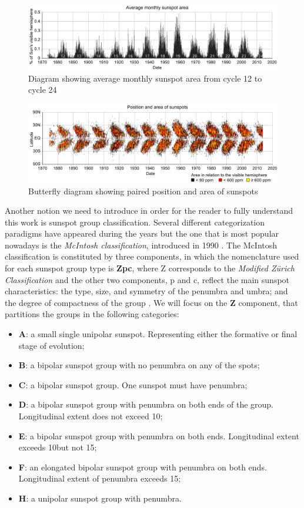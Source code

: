 \begin{figure}[t]
    \centering
    \includegraphics[width=\textwidth]{./pictures/ssarea}
    \caption{Diagram showing average monthly sunspot area from cycle 12 to cycle 24}
    \label{fig:ssarea}
\end{figure}
\begin{figure}[t]
    \centering
    \includegraphics[width=\textwidth]{./pictures/butterfly}
    \caption{Butterfly diagram showing paired position and area of sunspots}
    \label{fig:butterfly}
\end{figure}
Another notion we need to introduce in order for the reader to fully understand this work is sunspot group classification. Several different categorization paradigms have appeared during the years but the one that is most popular nowadays is the \textit{McIntosh classification}, introduced in 1990 \cite{mcintosh1990classification}. The McIntosh classification is constituted by three components, in which the nomenclature used for each sunspot group type is \textbf{Zpc}, where Z corresponds to the \textit{Modified Z\"{u}rich Classification} and the other two components, p and c, reflect the main sunspot characteristics: the type, size, and symmetry of the penumbra and umbra; and the degree of compactness of the group \cite{carrasco2015equivalence}. We will focus on the \textbf{Z} component, that partitions the groups in the following categories\cite{silso-class}:
\begin{itemize}
  \item \textbf{A}: a small single unipolar sunspot. Representing either the formative or final stage of evolution;
  \item \textbf{B}: a bipolar sunspot group with no penumbra on any of the spots;
  \item \textbf{C}: a bipolar sunspot group. One sunspot must have penumbra;
  \item \textbf{D}: a bipolar sunspot group with penumbra on both ends of the group. Longitudinal extent does not exceed 10\degree;
  \item \textbf{E}: a bipolar sunspot group with penumbra on both ends. Longitudinal extent exceeds 10\degree  but not 15\degree;
  \item \textbf{F}: an elongated bipolar sunspot group with penumbra on both ends. Longitudinal extent of penumbra exceeds 15\degree;
  \item \textbf{H}: a unipolar sunspot group with penumbra.
\end{itemize}
